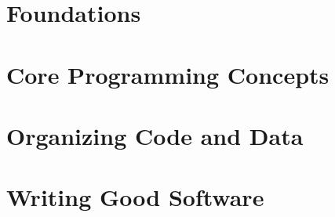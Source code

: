 \documentclass[
  12pt,
  twoside,        %
  openright,      %
]{book}
\begin{document}

\frontmatter
\pagestyle{empty}


\cleardoublepage{}

\pagestyle{fancy}
\tableofcontents
\cleardoublepage{}

\listoffigures
\cleardoublepage{}



\cleardoublepage{}

\mainmatter{}

\part{Foundations}


\part{Core Programming Concepts}


\part{Organizing Code and Data}


\part{Writing Good Software}
\end{document}
